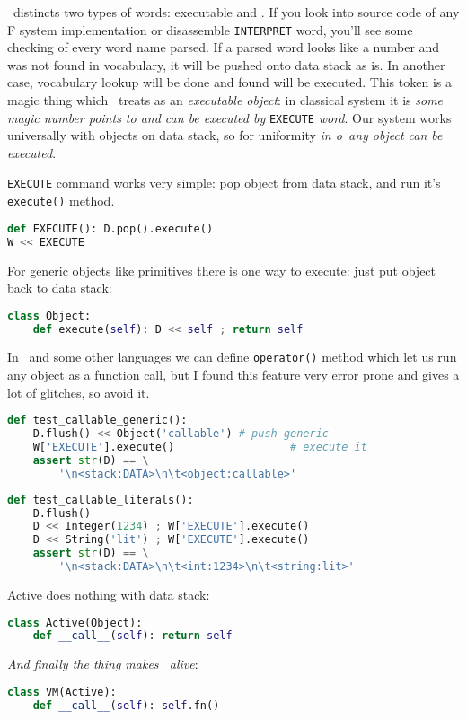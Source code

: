 \clearpage{}\label{callable}

\F\ distincts two types of words: executable and . If you look
into source code of any F system implementation or disassemble \verb|INTERPRET|
word, you'll see some checking of every word name parsed. If a parsed word looks
like a number and was not found in vocabulary, it will be pushed onto data stack
as is. In another case, vocabulary lookup will be done and found  \label{xt} will be executed. This token is a magic thing which \F\ treats
as an \emph{executable object}: in classical system it is \emph{some magic
number points to  and can be executed by} \verb|EXECUTE|
\emph{word}. Our system works universally with objects on data stack, so for
uniformity \emph{in o\F\ any object can be executed}.

\noindent
\verb|EXECUTE| command works very simple: pop object from data stack, and run
it's \verb|execute()| method.

\begin{lstlisting}[language=Python]
def EXECUTE(): D.pop().execute()
W << EXECUTE
\end{lstlisting}

For generic objects like primitives there is one
way to execute: just put object back to data stack:

\begin{lstlisting}[language=Python]
class Object:
	def execute(self): D << self ; return self
\end{lstlisting}

\noindent
In \py\ and some other languages we can define \verb|operator()| method which
let us run any object as a function call, but I found this feature very error
prone and gives a lot of glitches, so avoid it.

\begin{lstlisting}[language=Python]
def test_callable_generic():
	D.flush() << Object('callable')	# push generic
	W['EXECUTE'].execute()					# execute it
	assert str(D) == \
		'\n<stack:DATA>\n\t<object:callable>'
\end{lstlisting}
\begin{lstlisting}[language=Python]
def test_callable_literals():
	D.flush()
	D << Integer(1234) ; W['EXECUTE'].execute()
	D << String('lit') ; W['EXECUTE'].execute()
	assert str(D) == \
		'\n<stack:DATA>\n\t<int:1234>\n\t<string:lit>'
\end{lstlisting}

\clearpage
\noindent Active does nothing with data stack:
\begin{lstlisting}[language=Python]
class Active(Object):
	def __call__(self): return self
\end{lstlisting}

\noindent \emph{And finally the thing makes \F\ alive}: 
\begin{lstlisting}[language=Python]
class VM(Active):
	def __call__(self): self.fn()
\end{lstlisting}
